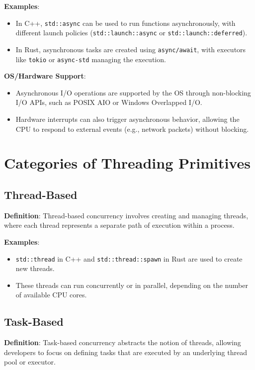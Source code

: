 \documentclass{article}
\begin{document}
\textbf{Examples}:
\begin{itemize}
    \item In C++, \texttt{std::async} can be used to run functions asynchronously, with different launch policies (\texttt{std::launch::async} or \texttt{std::launch::deferred}).
    \item In Rust, asynchronous tasks are created using \texttt{async/await}, with executors like \texttt{tokio} or \texttt{async-std} managing the execution.
\end{itemize}

\textbf{OS/Hardware Support}:
\begin{itemize}
    \item Asynchronous I/O operations are supported by the OS through non-blocking I/O APIs, such as POSIX AIO or Windows Overlapped I/O.
    \item Hardware interrupts can also trigger asynchronous behavior, allowing the CPU to respond to external events (e.g., network packets) without blocking.
\end{itemize}

\section*{Categories of Threading Primitives}

\subsection*{Thread-Based}
\textbf{Definition}: Thread-based concurrency involves creating and managing threads, where each thread represents a separate path of execution within a process.

\textbf{Examples}:
\begin{itemize}
    \item \texttt{std::thread} in C++ and \texttt{std::thread::spawn} in Rust are used to create new threads.
    \item These threads can run concurrently or in parallel, depending on the number of available CPU cores.
\end{itemize}

\subsection*{Task-Based}
\textbf{Definition}: Task-based concurrency abstracts the notion of threads, allowing developers to focus on defining tasks that are executed by an underlying thread pool or executor.
\end{document}
